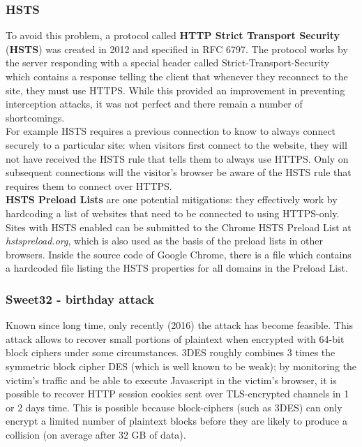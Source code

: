 \documentclass[a4paper, 10pt, titlepage]{article}
\begin{document}
\subsubsection*{HSTS}
To avoid this problem, a protocol called \textbf{HTTP Strict Transport Security} (\textbf{HSTS}) was created in 2012 and specified in RFC 6797. The protocol works by the server responding with a special header called Strict-Transport-Security which contains a response telling the client that whenever they reconnect to the site, they must use HTTPS. While this provided an improvement in preventing interception attacks, it was not perfect and there remain a number of shortcomings.\medskip\\
For example HSTS requires a previous connection to know to always connect securely to a particular site: when visitors first connect to the website, they will not have received the HSTS rule that tells them to always use HTTPS. Only on subsequent connections will the visitor's browser be aware of the HSTS rule that requires them to connect over HTTPS. \medskip\\
\textbf{HSTS Preload Lists} are one potential mitigations: they effectively work by hardcoding a list of websites that need to be connected to using HTTPS-only. Sites with HSTS enabled can be submitted to the Chrome HSTS Preload List at \textit{hstspreload.org}, which is also used as the basis of the preload lists in other browsers. Inside the source code of Google Chrome, there is a file which contains a hardcoded file listing the HSTS properties for all domains in the Preload List.

\subsubsection{Sweet32 - birthday attack}
Known since long time, only recently (2016) the attack has become
feasible. This attack allows to recover small portions of plaintext when encrypted with 64-bit block ciphers under some circumstances.  3DES roughly combines 3 times the symmetric block cipher DES (which
is well known to be weak); by monitoring the victim’s traffic and be able to execute Javascript in the victim’s browser, it is possible to recover HTTP session cookies sent over TLS-encrypted channels in 1 or 2 days time. This is possible because block-ciphers (such as 3DES) can only encrypt a limited number of plaintext blocks before they are likely to produce a collision (on average after 32 GB of data).
\end{document}
